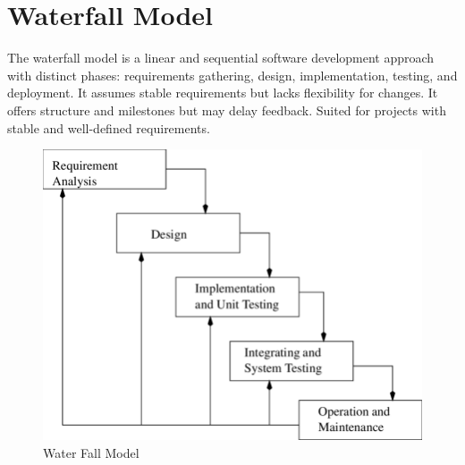 \section{Waterfall Model}
The waterfall model is a linear and sequential software development approach with distinct phases: requirements gathering, design, implementation, testing, and deployment. It assumes stable requirements but lacks flexibility for changes. It offers structure and milestones but may delay feedback. Suited for projects with stable and well-defined requirements.
\begin{figure}[ht]
    \centering  
    \includegraphics[width=\textwidth, height=0.4\textheight, keepaspectratio]{methodology/model_image/The-Waterfall-Model.png}    
    \caption{Water Fall Model}
    \label{fig:fig 3.6}
\end{figure}